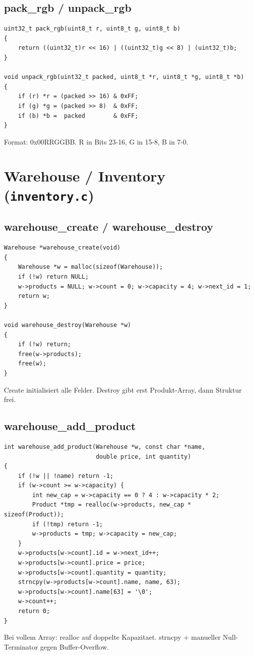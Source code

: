 \documentclass[10pt, a4paper]{article}
\begin{document}
\subsection{pack\_rgb / unpack\_rgb}
\begin{lstlisting}
uint32_t pack_rgb(uint8_t r, uint8_t g, uint8_t b)
{
    return ((uint32_t)r << 16) | ((uint32_t)g << 8) | (uint32_t)b;
}

void unpack_rgb(uint32_t packed, uint8_t *r, uint8_t *g, uint8_t *b)
{
    if (r) *r = (packed >> 16) & 0xFF;
    if (g) *g = (packed >> 8)  & 0xFF;
    if (b) *b =  packed        & 0xFF;
}
\end{lstlisting}
Format: 0x00RRGGBB. R in Bits 23-16, G in 15-8, B in 7-0.

\section{Warehouse / Inventory (\texttt{inventory.c})}

\subsection{warehouse\_create / warehouse\_destroy}
\begin{lstlisting}
Warehouse *warehouse_create(void)
{
    Warehouse *w = malloc(sizeof(Warehouse));
    if (!w) return NULL;
    w->products = NULL; w->count = 0; w->capacity = 4; w->next_id = 1;
    return w;
}

void warehouse_destroy(Warehouse *w)
{
    if (!w) return;
    free(w->products);
    free(w);
}
\end{lstlisting}
Create initialisiert alle Felder. Destroy gibt erst Produkt-Array, dann Struktur frei.

\subsection{warehouse\_add\_product}
\begin{lstlisting}
int warehouse_add_product(Warehouse *w, const char *name,
                          double price, int quantity)
{
    if (!w || !name) return -1;
    if (w->count >= w->capacity) {
        int new_cap = w->capacity == 0 ? 4 : w->capacity * 2;
        Product *tmp = realloc(w->products, new_cap * sizeof(Product));
        if (!tmp) return -1;
        w->products = tmp; w->capacity = new_cap;
    }
    w->products[w->count].id = w->next_id++;
    w->products[w->count].price = price;
    w->products[w->count].quantity = quantity;
    strncpy(w->products[w->count].name, name, 63);
    w->products[w->count].name[63] = '\0';
    w->count++;
    return 0;
}
\end{lstlisting}
Bei vollem Array: realloc auf doppelte Kapazitaet. strncpy + manueller Null-Terminator gegen Buffer-Overflow.
\end{document}
